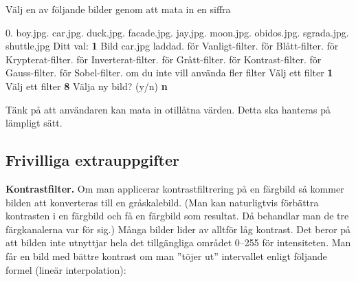 {\setlength{\parindent}{0cm}

 Välj en av följande bilder genom att mata in en siffra\newline

0. boy.jpg. car.jpg. duck.jpg. facade.jpg. jay.jpg. moon.jpg. obidos.jpg. sgrada.jpg. shuttle.jpg\newline
Ditt val: \textbf{1}\newline
Bild car.jpg laddad. för Vanligt-filter. för Blått-filter. för Krypterat-filter. för Inverterat-filter. för Grått-filter. för Kontrast-filter. för Gauss-filter. för Sobel-filter. om du inte vill använda fler filter\newline
Välj ett filter \textbf{1}\newline
Välj ett filter \textbf{8}\newline
Välja ny bild? (y/n) \textbf{n}\newline
}

Tänk på att användaren kan mata in otillåtna värden. Detta ska hanteras på lämpligt sätt.

\subsection{Frivilliga extrauppgifter}

\Task \textbf{Kontrastfilter.} Om man applicerar kontrastfiltrering på en färgbild så kommer bilden att konverteras till en gråskalebild. (Man kan naturligtvis förbättra kontrasten i en färgbild och få en färgbild som resultat. Då behandlar man de tre färgkanalerna var för sig.) Många bilder lider av alltför låg kontrast. Det beror på att bilden inte utnyttjar hela det tillgängliga området 0–255 för intensiteten. Man får en bild med bättre kontrast om man ''töjer ut'' intervallet enligt följande formel (lineär interpolation):

